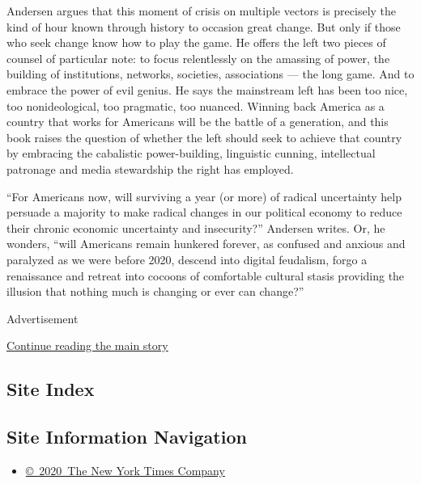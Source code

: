 Andersen argues that this moment of crisis on multiple vectors is
precisely the kind of hour known through history to occasion great
change. But only if those who seek change know how to play the game. He
offers the left two pieces of counsel of particular note: to focus
relentlessly on the amassing of power, the building of institutions,
networks, societies, associations --- the long game. And to embrace the
power of evil genius. He says the mainstream left has been too nice, too
nonideological, too pragmatic, too nuanced. Winning back America as a
country that works for Americans will be the battle of a generation, and
this book raises the question of whether the left should seek to achieve
that country by embracing the cabalistic power-building, linguistic
cunning, intellectual patronage and media stewardship the right has
employed.

``For Americans now, will surviving a year (or more) of radical
uncertainty help persuade a majority to make radical changes in our
political economy to reduce their chronic economic uncertainty and
insecurity?'' Andersen writes. Or, he wonders, ``will Americans remain
hunkered forever, as confused and anxious and paralyzed as we were
before 2020, descend into digital feudalism, forgo a renaissance and
retreat into cocoons of comfortable cultural stasis providing the
illusion that nothing much is changing or ever can change?''

Advertisement

\protect\hyperlink{after-bottom}{Continue reading the main story}

\hypertarget{site-index}{%
\subsection{Site Index}\label{site-index}}

\hypertarget{site-information-navigation}{%
\subsection{Site Information
Navigation}\label{site-information-navigation}}

\begin{itemize}
\tightlist
\item
  \href{https://help.nytimes3xbfgragh.onion/hc/en-us/articles/115014792127-Copyright-notice}{©~2020~The
  New York Times Company}
\end{itemize}

